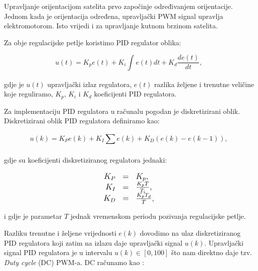 \documentclass[times, utf8, diplomski, numeric]{templates/template}
\begin{document}
{{{{                Upravljanje orijentacijom satelita prvo započinje određivanjem orijentacije. Jednom kada je orijentacija određena, upravljački PWM signal upravlja elektromotorom. Isto vrijedi i za upravljanje kutnom brzinom satelita. 

                Za obje regulacijske petlje koristimo PID regulator oblika:

                \begin{equation}
                    u(t) = K_p e(t) + K_i \int_{}^{}{e(t)dt} + K_d \frac{de(t)}{dt},
                \end{equation}

                gdje je $u(t)$ upravljački izlaz regulatora, $e(t)$ razlika željene i trenutne veličine koje reguliramo, $K_p$, $K_i$ i $K_d$ koeficijenti PID regulatora.

                Za implementaciju PID regulatora u računalu pogodan je diskretizirani oblik. Diskretizirani oblik PID regulatora \cite{diskr_pid} definiramo kao:

                \begin{equation}
                    u(k) = K_P e(k) + K_I \sum_{}^{}{e(k)} + K_D (e(k) - e(k-1)),
                \end{equation}

                gdje su koeficijenti diskretiziranog regulatora jednaki:

                \begin{equation}
                \large
                \label{eq:diskr_pid_reg}
                    \begin{array}{rcl}
                        K_P & = & K_p,\\
                        K_I & = & \frac{K_p T}{T_i}, \\
                        K_D & = & \frac{K_p T_d}{T},
                    \end{array}
                \end{equation}

                i gdje je parametar $T$ jednak vremenskom periodu pozivanja regulacijske petlje.

                Razliku trenutne i željene vrijednosti $e(k)$ dovodimo na ulaz diskretiziranog PID regulatora koji zatim na izlazu daje upravljački signal $u(k)$. Upravljački signal PID regulatora je u intervalu $u(k) \in \left[ 0, 100 \right]$ što nam direktno daje tzv. \emph{Duty cycle} (DC) PWM-a. $\text{DC}$ računamo kao \cite{dc_pwm}:

}}}}
\end{document}

